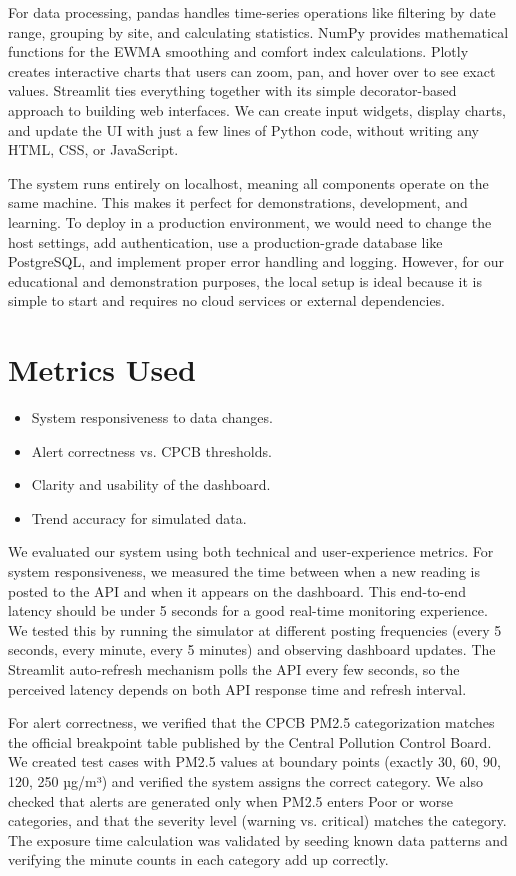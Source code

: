 \documentclass[12pt]{report}
\begin{document}
For data processing, pandas handles time-series operations like filtering by date range, grouping by site, and calculating statistics. NumPy provides mathematical functions for the EWMA smoothing and comfort index calculations. Plotly creates interactive charts that users can zoom, pan, and hover over to see exact values. Streamlit ties everything together with its simple decorator-based approach to building web interfaces. We can create input widgets, display charts, and update the UI with just a few lines of Python code, without writing any HTML, CSS, or JavaScript.

The system runs entirely on localhost, meaning all components operate on the same machine. This makes it perfect for demonstrations, development, and learning. To deploy in a production environment, we would need to change the host settings, add authentication, use a production-grade database like PostgreSQL, and implement proper error handling and logging. However, for our educational and demonstration purposes, the local setup is ideal because it is simple to start and requires no cloud services or external dependencies.

\section{Metrics Used}
\begin{itemize}
  \item System responsiveness to data changes.
  \item Alert correctness vs. CPCB thresholds.
  \item Clarity and usability of the dashboard.
  \item Trend accuracy for simulated data.
\end{itemize}

We evaluated our system using both technical and user-experience metrics. For system responsiveness, we measured the time between when a new reading is posted to the API and when it appears on the dashboard. This end-to-end latency should be under 5 seconds for a good real-time monitoring experience. We tested this by running the simulator at different posting frequencies (every 5 seconds, every minute, every 5 minutes) and observing dashboard updates. The Streamlit auto-refresh mechanism polls the API every few seconds, so the perceived latency depends on both API response time and refresh interval.

For alert correctness, we verified that the CPCB PM2.5 categorization matches the official breakpoint table published by the Central Pollution Control Board. We created test cases with PM2.5 values at boundary points (exactly 30, 60, 90, 120, 250 µg/m³) and verified the system assigns the correct category. We also checked that alerts are generated only when PM2.5 enters Poor or worse categories, and that the severity level (warning vs. critical) matches the category. The exposure time calculation was validated by seeding known data patterns and verifying the minute counts in each category add up correctly.
\end{document}
